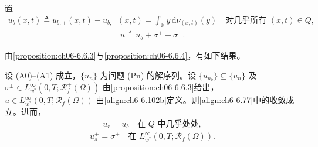 \documentclass[../../main.tex]{subfiles}%
\begin{document}
置
\begin{align}
u_b(x,t)\triangleq u_{b,+}(x,t)-u_{b,-}(x,t)=\int_\mathbb{R}y\,\mathrm{d}\nu_{(x,t)}(y)
\quad\text{对几乎所有 }(x,t)\in Q, \label{align:ch6-6.102a}
\end{align}
\begin{align}
u\triangleq u_b+\sigma^+-\sigma^-. \label{align:ch6-6.102b}
\end{align}

由\cref{proposition:ch06-6.6.3}与\cref{proposition:ch06-6.6.4}，有如下结果。

\begin{proposition}\label{proposition:ch06-6.6.5}
设 (A0)--(A1) 成立，$\{u_n\}$ 为问题 (Pn) 的解序列。设 $\{u_{n_k}\}\subseteq\{u_n\}$ 及 $\sigma^\pm\in L^\infty_{w^*}(0,T;\mathscr{R}^+_f(\Omega))$ 由\cref{proposition:ch06-6.6.3}给出，$u\in L^\infty_{w^*}(0,T;\mathscr{R}_f(\Omega))$ 由\eqref{align:ch6-6.102b}定义。则\eqref{align:ch6-6.77}中的收敛成立。进而，
\begin{align}
u_r=u_b \quad\text{在 }Q\text{ 中几乎处处}, \label{align:ch6-6.103a}
\end{align}
\begin{align}
u^\pm_s=\sigma^\pm \quad\text{在 }L^\infty_{w^*}(0,T;\mathscr{R}_f(\Omega)). \label{align:ch6-6.103b}
\end{align}
\end{proposition}
\end{document}
